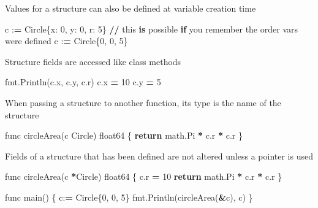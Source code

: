 \documentclass[]{book}
\newenvironment{Shaded}{\begin{snugshade}}{\end{snugshade}}
\newcommand{\BuiltInTok}[1]{#1}
\newcommand{\ControlFlowTok}[1]{\textcolor[rgb]{0.13,0.29,0.53}{\textbf{#1}}}
\newcommand{\DecValTok}[1]{\textcolor[rgb]{0.00,0.00,0.81}{#1}}
\newcommand{\KeywordTok}[1]{\textcolor[rgb]{0.13,0.29,0.53}{\textbf{#1}}}
\newcommand{\NormalTok}[1]{#1}
\newcommand{\OperatorTok}[1]{\textcolor[rgb]{0.81,0.36,0.00}{\textbf{#1}}}
\begin{document}
Values for a structure can also be defined at variable creation time

\begin{Shaded}
\begin{Highlighting}[]
\NormalTok{c :}\OperatorTok{=}\NormalTok{ Circle\{x: }\DecValTok{0}\NormalTok{, y: }\DecValTok{0}\NormalTok{, r: }\DecValTok{5}\NormalTok{\}}
\OperatorTok{//}\NormalTok{ this }\KeywordTok{is}\NormalTok{ possible }\ControlFlowTok{if}\NormalTok{ you remember the order }\BuiltInTok{vars}\NormalTok{ were defined}
\NormalTok{c :}\OperatorTok{=}\NormalTok{ Circle\{}\DecValTok{0}\NormalTok{, }\DecValTok{0}\NormalTok{, }\DecValTok{5}\NormalTok{\}}
\end{Highlighting}
\end{Shaded}

Structure fields are accessed like class methods

\begin{Shaded}
\begin{Highlighting}[]
\NormalTok{fmt.Println(c.x, c.y, c.r)}
\NormalTok{c.x }\OperatorTok{=} \DecValTok{10}
\NormalTok{c.y }\OperatorTok{=} \DecValTok{5}
\end{Highlighting}
\end{Shaded}

When passing a structure to another function, its type is the name of the structure

\begin{Shaded}
\begin{Highlighting}[]
\NormalTok{func circleArea(c Circle) float64 \{}
    \ControlFlowTok{return}\NormalTok{ math.Pi }\OperatorTok{*}\NormalTok{ c.r }\OperatorTok{*}\NormalTok{ c.r     }
\NormalTok{\}                                  }
\end{Highlighting}
\end{Shaded}

Fields of a structure that has been defined are not altered unless a pointer is used

\begin{Shaded}
\begin{Highlighting}[]
\NormalTok{func circleArea(c }\OperatorTok{*}\NormalTok{Circle) float64 \{}
\NormalTok{    c.r }\OperatorTok{=} \DecValTok{10}                        
    \ControlFlowTok{return}\NormalTok{ math.Pi }\OperatorTok{*}\NormalTok{ c.r }\OperatorTok{*}\NormalTok{ c.r      }
\NormalTok{\}                                   }
                                    
\NormalTok{func main() \{                       }
\NormalTok{    c:}\OperatorTok{=}\NormalTok{ Circle\{}\DecValTok{0}\NormalTok{, }\DecValTok{0}\NormalTok{, }\DecValTok{5}\NormalTok{\}             }
\NormalTok{    fmt.Println(circleArea(}\OperatorTok{&}\NormalTok{c), c)  }
\NormalTok{\}}
\end{Highlighting}
\end{Shaded}
\end{document}
